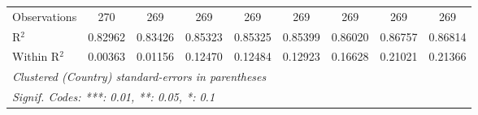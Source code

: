 \begin{table}[htbp]
\begin{tabular}{lcccccccc}
      Observations                              & 270      & 269      & 269           & 269           & 269           & 269           & 269           & 269\\  
      R$^2$                                     & 0.82962  & 0.83426  & 0.85323       & 0.85325       & 0.85399       & 0.86020       & 0.86757       & 0.86814\\  
      Within R$^2$                              & 0.00363  & 0.01156  & 0.12470       & 0.12484       & 0.12923       & 0.16628       & 0.21021       & 0.21366\\  
      \midrule \midrule
      \multicolumn{9}{l}{\emph{Clustered (Country) standard-errors in parentheses}}\\
      \multicolumn{9}{l}{\emph{Signif. Codes: ***: 0.01, **: 0.05, *: 0.1}}\\
   \end{tabular}
\end{table}


